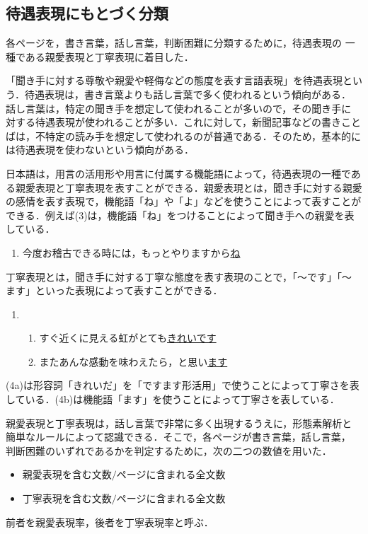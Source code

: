 \documentclass{nlp}
\begin{document}
\subsection{待遇表現にもとづく分類}
各ページを，書き言葉，話し言葉，判断困難に分類するために，待遇表現の
一種である親愛表現と丁寧表現に着目した．

「聞き手に対する尊敬や親愛や軽侮などの態度を表す言語表現」を待遇表現とい
う．待遇表現は，書き言葉よりも話し言葉で多く使われるという傾向がある．
話し言葉は，特定の聞き手を想定して使われることが多いので，その聞き手に
対する待遇表現が使われることが多い．これに対して，新聞記事などの書きこと
ばは，不特定の読み手を想定して使われるのが普通である．そのため，基本的に
は待遇表現を使わないという傾向がある．

日本語は，用言の活用形や用言に付属する機能語によって，待遇表現の一種であ
る親愛表現と丁寧表現を表すことができる．親愛表現とは，聞き手に対する親愛
の感情を表す表現で，機能語「ね」や「よ」などを使うことによって表すことが
できる．例えば(3)は，機能語「ね」をつけることによって聞き手への親愛を表
している．
\vspace{10pt}
\begin{enumerate}
 \item 今度お稽古できる時には，もっとやりますから\underline{ね}
       \addtocounter{exnum}{1}
\end{enumerate}
\vspace{10pt}
   
丁寧表現とは，聞き手に対する丁寧な態度を表す表現のことで，「〜です」「〜
ます」といった表現によって表すことができる．
\vspace{10pt}
\begin{enumerate}
 \item
      \begin{enumerate}
       \item すぐ近くに見える虹がとても\underline{きれいです}
       \item またあんな感動を味わえたら，と思い\underline{ます}
      \end{enumerate}
\end{enumerate}
\vspace{10pt}
\addtocounter{exnum}{1}
(4a)は形容詞「きれいだ」を「ですます形活用」で使うことによって丁寧さを表
している．(4b)は機能語「ます」を使うことによって丁寧さを表している．

親愛表現と丁寧表現は，話し言葉で非常に多く出現するうえに，形態素解析と
簡単なルールによって認識できる．そこで，各ページが書き言葉，話し言葉，
判断困難のいずれであるかを判定するために，次の二つの数値を用いた．
\begin{itemize}
 \item 親愛表現を含む文数$/$ページに含まれる全文数
 \item 丁寧表現を含む文数$/$ページに含まれる全文数
\end{itemize}
前者を親愛表現率，後者を丁寧表現率と呼ぶ．
\end{document}
